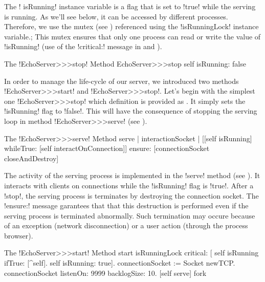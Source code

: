 \documentclass[a4paper,10pt,twoside]{book}
\begin{document}
The \ct! isRunning! instance variable is a flag that is set to \ct!true! while the serving is running.
As we'll see below, it can be accessed by different processes.
Therefore, we use the mutex (see ) referenced using the \ct!isRunningLock! instance variable.;
This mutex ensures that only one process can read or write the value of \ct!isRunning! (use of the \ct!critical:! message in  and ).

\begin{method}{The \ct!EchoServer>>>stop! Method}
EchoServer>>>stop
	self isRunning: false
\end{method}

In order to manage the life-cycle of our server, we introduced two methods \ct!EchoServer>>>start! and \ct!EchoServer>>>stop!.
Let's begin with the simplest one \ct!EchoServer>>>stop! which definition is provided as .
It simply sets the \ct!isRunning! flag to \ct!false!.
This will have the consequence of stopping the serving loop in method \ct!EchoServer>>>serve! (see ). 

\begin{method}{The \ct!EchoServer>>>serve! Method}
serve
| interactionSocket |
[[self isRunning]
	whileTrue: [self interactOnConnection]]
	ensure: [connectionSocket closeAndDestroy]
\end{method}

The activity of the serving process is implemented in the \ct!serve! method (see ).
It interacts with clients on connections while the \ct!isRunning! flag is \ct!true!.
After a \ct!stop!, the serving process is terminates by destroying the connection socket.
The \ct!ensure:! message garantees that that this destruction is performed even if the serving process is terminated abnormally. 
Such termination may occure because of an exception (\eg network disconnection) or a user action (\eg through the process browser).   

\begin{method}{The \ct!EchoServer>>>start! Method}
start
	isRunningLock critical: [
		self isRunning ifTrue: [^self].
		self isRunning: true].
	connectionSocket := Socket newTCP.
	connectionSocket listenOn: 9999 backlogSize: 10.
	[self serve] fork
\end{method}
\end{document}
